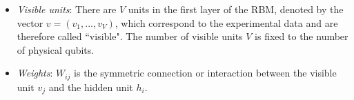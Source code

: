 \documentclass[submission, Phys, hidelnks]{SciPost}
\begin{document}
\begin{itemize}
\item {\it Visible units}: There are $V$ units in the first layer of the RBM, denoted by the vector $v=(v_1, ..., v_V)$, which correspond to the experimental data and are therefore called ``visible". The number of visible units $V$ is fixed to the number of physical qubits.

\item {\it Weights}: $W_{ij}$ is the symmetric connection or interaction between the visible unit $v_j$ and the hidden unit $h_i$.

\end{itemize}



\nolinenumbers
\end{document}
